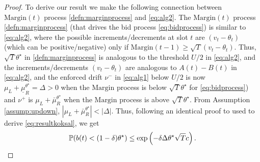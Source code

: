 \begin{proof}
To derive our result we make the following connection between $\text{Margin}(t)$ process \eqref{defn:marginprocess} and \eqref{eq:alg2}.
The $\text{Margin}(t)$ process \eqref{defn:marginprocess} (that drives the bid process \eqref{eq:bidprocess}) is similar to \eqref{eq:alg2}, where the possible increments/decrements at slot $t$ are 
$(v_t-\theta_t)$ (which can be positive/negative) only if $\text{Margin}(t-1)\ge \sqrt{T}(v_t-\theta_t)$. Thus, $\sqrt{T} \theta^\star$ in \eqref{defn:marginprocess} is analogous to the threshold $U/2$ in \eqref{eq:alg2}, and the increments/decrements $(v_t-\theta_t)$  are analogous 
to $A(t)-B(t)$ in \eqref{eq:alg2}, and the enforced drift $\nu^{-}$ in \eqref{eq:alg1} below $U/2$  is now $\mu_L+ \underline {\mu}_R^{\theta^\star}=\Delta > 0$ when the $\text{Margin}$ process is below $\sqrt{T} \theta^\star$ for \eqref{eq:bidprocess}) and $\nu^+$ is $\mu_L+\bar {\mu}_R^{\theta^\star}$ when the $\text{Margin}$ process is above $\sqrt{T} \theta^\star$.
From Assumption \ref{assump:updown}, $|\mu_L+\bar {\mu}_R^{\theta^\star}| < |\Delta|$. Thus,  following an identical proof to \cite[Lemma 2]{Koksal} used to derive \eqref{eq:resultkoksal}, 
we get
$${\mathbb{P}}(b(t) < (1-\delta)\theta^\star) \le \exp\left(-  \delta \Delta \theta^\star \sqrt{T} c\right).$$
\end{proof} 


